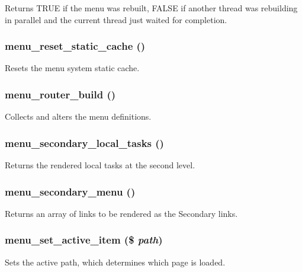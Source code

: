 \begin{DoxyReturn}{Returns}
TRUE if the menu was rebuilt, FALSE if another thread was rebuilding in parallel and the current thread just waited for completion. 
\end{DoxyReturn}
\hypertarget{group__menu_ga1475a636851e8c953db72e5b1ab2c0f0}{
\subsubsection[{menu\_\-reset\_\-static\_\-cache}]{\setlength{\rightskip}{0pt plus 5cm}menu\_\-reset\_\-static\_\-cache ()}}
\label{group__menu_ga1475a636851e8c953db72e5b1ab2c0f0}
Resets the menu system static cache. \hypertarget{group__menu_ga1f6713b93173302fb29d7bc9578b7530}{
\subsubsection[{menu\_\-router\_\-build}]{\setlength{\rightskip}{0pt plus 5cm}menu\_\-router\_\-build ()}}
\label{group__menu_ga1f6713b93173302fb29d7bc9578b7530}
Collects and alters the menu definitions. \hypertarget{group__menu_gabf84c295da2c986cd8ad305935e31ffb}{
\subsubsection[{menu\_\-secondary\_\-local\_\-tasks}]{\setlength{\rightskip}{0pt plus 5cm}menu\_\-secondary\_\-local\_\-tasks ()}}
\label{group__menu_gabf84c295da2c986cd8ad305935e31ffb}
Returns the rendered local tasks at the second level. \hypertarget{group__menu_gaf4a8dad6070035a498c598c5fe9ca255}{
\subsubsection[{menu\_\-secondary\_\-menu}]{\setlength{\rightskip}{0pt plus 5cm}menu\_\-secondary\_\-menu ()}}
\label{group__menu_gaf4a8dad6070035a498c598c5fe9ca255}
Returns an array of links to be rendered as the Secondary links. \hypertarget{group__menu_gacdd22102c2ba6545645ae34be563d1d4}{
\subsubsection[{menu\_\-set\_\-active\_\-item}]{\setlength{\rightskip}{0pt plus 5cm}menu\_\-set\_\-active\_\-item (\$ {\em path})}}
\label{group__menu_gacdd22102c2ba6545645ae34be563d1d4}
Sets the active path, which determines which page is loaded.

